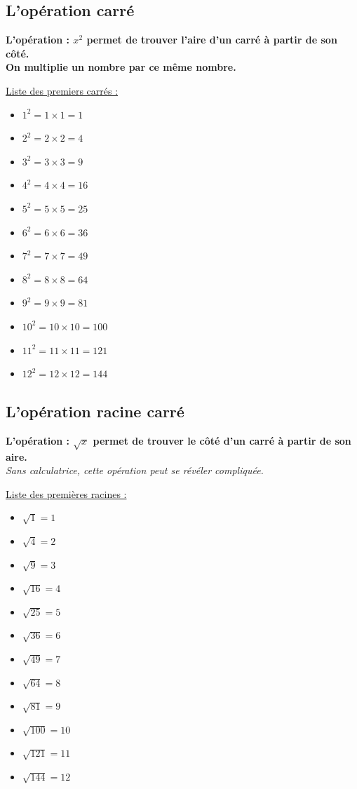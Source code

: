 \documentclass[12pt]{article}
\begin{document}
\begin{multicols}{2}

	\subsection*{L'opération carré}

	\textbf{L'opération : $x^2$ permet de trouver l'aire d'un carré à partir de son côté.} \\
	\textbf{On multiplie un nombre par ce même nombre.}

	\underline{Liste des premiers carrés :}

	\begin{itemize}
		\item $1^2 = 1 \times 1 = 1$
		\item $2^2 = 2 \times 2 = 4$
		\item $3^2 = 3 \times 3 = 9$
		\item $4^2 = 4 \times 4 = 16$
		\item $5^2 = 5 \times 5 = 25$
		\item $6^2 = 6 \times 6 = 36$
		\item $7^2 = 7 \times 7 = 49$
		\item $8^2 = 8 \times 8 = 64$
		\item $9^2 = 9 \times 9 = 81$
		\item $10^2 = 10 \times 10 = 100$
		\item $11^2 = 11 \times 11 = 121$
		\item $12^2 = 12 \times 12 = 144$
	\end{itemize}

	\subsection*{L'opération racine carré}

	\textbf{L'opération : $\sqrt{x}$ permet de trouver le côté d'un carré à partir de son aire.}\\
	\textit{Sans calculatrice, cette opération peut se révéler compliquée.}

	\underline{Liste des premières racines : }

	\begin{itemize}
		\item $\sqrt{1} = 1$
		\item $\sqrt{4} = 2$
		\item $\sqrt{9} = 3$
		\item $\sqrt{16} = 4$
		\item $\sqrt{25} = 5$
		\item $\sqrt{36} = 6$
		\item $\sqrt{49} = 7$
		\item $\sqrt{64} = 8$
		\item $\sqrt{81} = 9$
		\item $\sqrt{100} = 10$
		\item $\sqrt{121} = 11$
		\item $\sqrt{144} = 12$
	\end{itemize}
\end{multicols}
\end{document}
